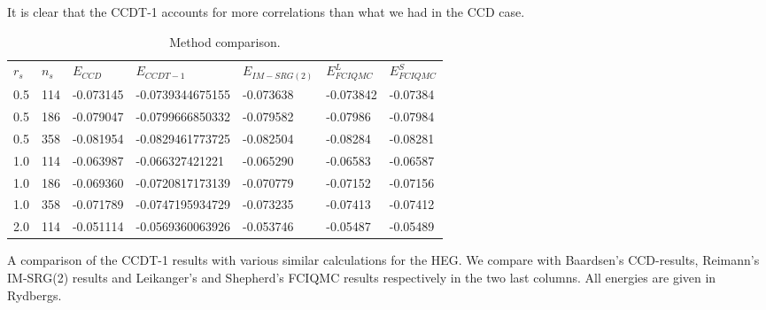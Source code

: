 It is clear that the CCDT-1 accounts for more correlations than what we had in the CCD case. 






\begin{table}[h]
\caption{Method comparison.}
\begin{center}
\begin{threeparttable}
\begin{tabular}{l l l l l l l}
    \toprule
$r_s$ & $n_s$ & $E_{CCD}$  & $E_{CCDT-1}$ & $E_{IM-SRG(2)}$ &$ E^L_{FCIQMC}$ & $E^S_{FCIQMC}$ \\
0.5 &114 &-0.073145&-0.0739344675155&-0.073638&-0.073842&-0.07384\\
0.5 &186 &-0.079047&-0.0799666850332&-0.079582&-0.07986&-0.07984 \\
0.5 &358 &-0.081954&-0.0829461773725&-0.082504&-0.08284&-0.08281 \\ \hline
1.0 &114 &-0.063987&-0.066327421221&-0.065290&-0.06583&-0.06587 \\
1.0 &186 &-0.069360&-0.0720817173139&-0.070779&-0.07152&-0.07156 \\
1.0 &358 &-0.071789&-0.0747195934729&-0.073235&-0.07413&-0.07412 \\ \hline
2.0 &114 &-0.051114&-0.0569360063926&-0.053746&-0.05487&-0.05489 \\
\bottomrule
\end{tabular}
\begin{tablenotes}
A comparison of the CCDT-1 results with various similar calculations for the HEG. We compare with Baardsen's \cite{Baardsen2014} CCD-results, Reimann's IM-SRG(2) results \cite{Reimann2013} and Leikanger's \cite{Leikanger2013} and Shepherd's \cite{Shepherd2012} FCIQMC results respectively in the two last columns. All energies are given in Rydbergs.
\end{tablenotes}
\end{threeparttable}
\end{center}
\label{tab:ccdt_comparison_chart}
\end{table}

%




